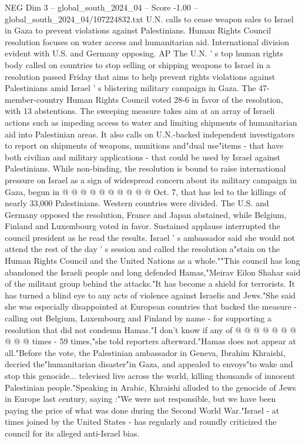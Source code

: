 \begin{textsample}{NEG Dim 3 – global\_south\_2024\_04 – Score -1.00 – global\_south\_2024\_04/107224832.txt}  \label{ex:f3_neg_243}
U.N. calls to cease weapon sales to Israel in Gaza to prevent violations against Palestinians.
Human Rights Council resolution focuses on water access and humanitarian aid.
International division evident with U.S. and Germany opposing.
AP The U.N. ' s top human rights body called on countries to stop selling or shipping weapons to Israel in a resolution passed Friday that aims to help prevent rights violations against Palestinians amid Israel ' s blistering military campaign in Gaza.
The 47-member-country Human Rights Council voted 28-6 in favor of the resolution, with 13 abstentions.
The sweeping measure takes aim at an array of Israeli actions such as impeding access to water and limiting shipments of humanitarian aid into Palestinian areas.
It also calls on U.N.-backed independent investigators to report on shipments of weapons, munitions and"dual use"items - that have both civilian and military applications - that could be used by Israel against Palestinians.
While non-binding, the resolution is bound to raise international pressure on Israel as a sign of widespread concern about its military campaign in Gaza, begun in @ @ @ @ @ @ @ @ @ @ Oct. 7, that has led to the killings of nearly 33,000 Palestinians.
Western countries were divided.
The U.S. and Germany opposed the resolution, France and Japan abstained, while Belgium, Finland and Luxembourg voted in favor.
Sustained applause interrupted the council president as he read the results.
Israel ' s ambassador said she would not attend the rest of the day ' s session and called the resolution a"stain on the Human Rights Council and the United Nations as a whole.""This council has long abandoned the Israeli people and long defended Hamas,"Meirav Eilon Shahar said of the militant group behind the attacks."It has become a shield for terrorists.
It has turned a blind eye to any acts of violence against Israelis and Jews."She said she was especially disappointed at European countries that backed the measure - calling out Belgium, Luxembourg and Finland by name - for supporting a resolution that did not condemn Hamas."I don't know if any of @ @ @ @ @ @ @ @ @ @ times - 59 times,"she told reporters afterward."Hamas does not appear at all."Before the vote, the Palestinian ambassador in Geneva, Ibrahim Khraishi, decried the"humanitarian disaster"in Gaza, and appealed to envoys"to wake and stop this genocide... televised live across the world, killing thousands of innocent Palestinian people."Speaking in Arabic, Khraishi alluded to the genocide of Jews in Europe last century, saying :"We were not responsible, but we have been paying the price of what was done during the Second World War."Israel - at times joined by the United States - has regularly and roundly criticized the council for its alleged anti-Israel bias.

\end{textsample}
